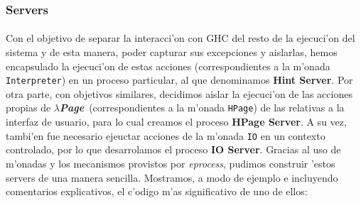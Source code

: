 \documentclass[a4paper]{article}
\newcommand{\hpage}{\textbf{\textsl{$\lambda$Page}}}
\begin{document}
\newpage
\subsubsection{Servers}
\paragraph{}Con el objetivo de separar la interacci'on con GHC del resto de la ejecuci'on del sistema y de esta manera, poder capturar sus excepciones y aislarlas, hemos encapsulado la ejecuci'on de estas acciones (correspondientes a la m'onada \texttt{Interpreter}) en un proceso particular, al que denominamos \textbf{Hint Server}.  Por otra parte, con objetivos similares, decidimos aislar la ejecuci'on de las acciones propias de \hpage\ (correspondientes a la m'onada \texttt{HPage}) de las relativas a la interfaz de usuario, para lo cual creamos el proceso \textbf{HPage Server}.  A su vez, tambi'en fue necesario ejeuctar acciones de la m'onada \texttt{IO} en un contexto controlado, por lo que desarrolamos el proceso \textbf{IO Server}.  Gracias al uso de m'onadas y los mecanismos provistos por \textsl{eprocess}, pudimos construir 'estos servers de una manera sencilla.   Mostramos, a modo de ejemplo e incluyendo comentarios explicativos, el c'odigo m'as significativo de uno de ellos:
\end{document}
